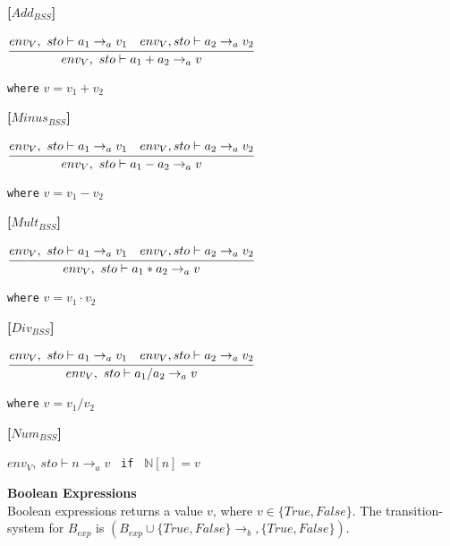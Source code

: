 \textbf{[$Add_{BSS}$]}\\
\begin{center}
	\begin{math}
	\cfrac
		{env_V,\ sto \vdash a_1 \rightarrow_a v_1 \quad env_V, sto \vdash a_2 \rightarrow_a v_2}
		{env_V,\ sto \vdash a_1 + a_2 \rightarrow_a v}
	\end{math}
	
	
	\texttt{where} $v = v_1 + v_2$
\end{center}

\textbf{[$Minus_{BSS}$]}\\
\begin{center}
	\begin{math}
	\cfrac
		{env_V,\ sto \vdash a_1 \rightarrow_a v_1 \quad env_V, sto \vdash a_2 \rightarrow_a v_2}
		{env_V,\ sto \vdash a_1 - a_2 \rightarrow_a v}
	\end{math}
	
	
	\texttt{where} $v = v_1 - v_2$
\end{center}

\textbf{[$Mult_{BSS}$]}\\
\begin{center}
	\begin{math}
	\cfrac
	{env_V,\ sto \vdash a_1 \rightarrow_a v_1 \quad env_V, sto \vdash a_2 \rightarrow_a v_2}
	{env_V,\ sto \vdash a_1 * a_2 \rightarrow_a v}
	\end{math}
	
	
	\texttt{where} $v = v_1 \cdot v_2$
\end{center}

\textbf{[$Div_{BSS}$]}\\
\begin{center}
	\begin{math}
	\cfrac
	{env_V,\ sto \vdash a_1 \rightarrow_a v_1 \quad env_V, sto \vdash a_2 \rightarrow_a v_2}
	{env_V,\ sto \vdash a_1 / a_2 \rightarrow_a v}
	\end{math}
	
	
	\texttt{where} $v = v_1 / v_2$
\end{center}

\textbf{[$Num_{BSS}$]}\\
\begin{center}
	\begin{math}
		env_V,\ sto \vdash n \rightarrow_a v
	\end{math}
	\texttt{ if } $\mathbb{N}[n] = v$
\end{center}

\textbf{\large{Boolean Expressions}}\\
Boolean expressions returns a value $v$, where $v \in \{True, False\}$.
The transition-system for $B_{exp}$ is $(B_{exp} \cup \{True, False\} \rightarrow_b, \{True, False\})$.

